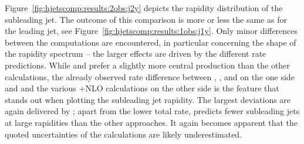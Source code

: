 Figure~\ref{fig:hjetscomp:results:2obs:j2y} depicts the rapidity
distribution of the subleading jet. The outcome of this comparison is
more or less the same as for the leading jet, see
Figure~\ref{fig:hjetscomp:results:1obs:j1y}. Only minor differences 
between the computations are encountered, in particular concerning the
shape of the rapidity spectrum -- the larger effects are driven by the
different rate predictions. While \Sherpa \NNLOPS and \MGaMC prefer a
slightly more central production than the other calculations, the
already observed rate difference between \Powheg \NNLOPS, \MGaMC,
\Herwig and \Sherpa \MEPSatNLO on the one side and \Sherpa \NNLOPS and
the various \GoSam{}+\Sherpa NLO calculations on the other side is the
feature that stands out when plotting the subleading jet rapidity.
The largest deviations are again delivered by \Hej; apart from the
lower total rate, \Hej predicts fewer subleading jets at large
rapidities than the other approaches. It again becomes apparent that
the quoted uncertainties of the \NNLOPS calculations are likely
underestimated.

